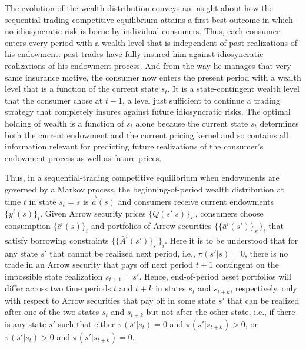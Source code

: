 The evolution of the wealth distribution conveys an
insight about how the sequential-trading competitive equilibrium
attains a first-best outcome in which no idiosyncratic risk is
borne by individual consumers. Thus, each consumer
enters every period with a wealth level that is independent of
past realizations of his endowment: past trades have
fully insured him against  idiosyncratic realizations of his
endowment process. And from the way he manages  that very same insurance motive, the consumer
now enters the present period with a wealth level that is a
function of the current state $s_t$. It is a state-contingent
wealth level that  the consumer chose at $t-1$, a level  just sufficient to
continue  a trading strategy that completely  insures against future
idiosyncratic risks. The optimal holding of wealth is  a function
 of $s_t$ alone because the current state $s_t$ determines both the
current endowment and the current pricing kernel  and so contains all information
relevant for predicting
future realizations of the consumer's endowment process as well as future prices.


Thus, in a sequential-trading competitive 
equilibrium when endowments are governed by a 
Markov process, the beginning-of-period wealth
distribution at time $t$ in state $s_t=s$
is $\vec {\bar a}(s)$ and consumers receive current
endowments $\{y^i(s)\}_i$. Given Arrow security
prices $\{Q(s'|s)\}_{s'}$, consumers choose
consumption $\{\bar c^i(s)\}_i$ and portfolios
of Arrow securities $\{\{\bar a^i(s')\}_{s'}\}_i$ 
that satisfy borrowing constraints 
$\{\{\bar A^i(s')\}_{s'}\}_i$.
Here it is to be understood that for any state $s'$
that cannot be realized next period, i.e.,
$\pi(s'|s)=0$, there is no trade in an Arrow
security that pays off next period $t+1$ 
contingent on the impossible state realization
$s_{t+1}=s'$. 
Hence, end-of-period asset portfolios will differ 
across two time periods $t$ and $t+k$ in states 
$s_t$ and $s_{t+k}$, respectively, only with
respect to Arrow securities that pay off in
some state $s'$ that can be realized
after one of the two states $s_t$ and
$s_{t+k}$ but not after the other state, i.e.,
if there is any state $s'$ such that
either $\pi(s'|s_t)=0$ and $\pi(s'|s_{t+k})>0$, 
or $\pi(s'|s_t)>0$ and 
$\pi(s'|s_{t+k})=0$.

